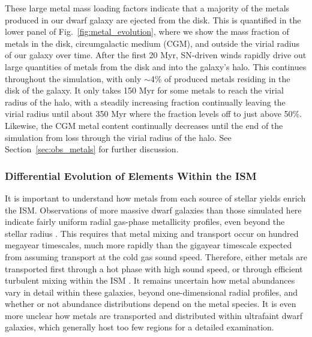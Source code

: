 \documentclass[fleqn,usenatbib,useAMS]{mnras}
\begin{document}
These large metal mass loading factors indicate that a majority of the metals produced in our dwarf galaxy are ejected from the disk. This is quantified in the lower panel of Fig.~\ref{fig:metal_evolution}, where we show the mass fraction of metals in the disk, circumgalactic medium (CGM), and outside the virial radius of our galaxy over time. After the first 20 Myr, SN-driven winds rapidly drive out large quantities of metals from the disk and into the galaxy's halo. This continues throughout the simulation, with only $\sim$4\% of produced metals residing in the disk of the galaxy. It only takes 150 Myr for some metals to reach the virial radius of the halo, with a steadily increasing fraction continually leaving the virial radius until about 350 Myr where the fraction levels off to just above 50\%. Likewise, the CGM metal content continually decreases until the end of the simulation from loss through the virial radius of the halo. See Section~\ref{sec:obs_metals} for further discussion.

\subsubsection{Differential Evolution of Elements Within the ISM}
It is important to understand how metals from each source of stellar yields enrich the ISM. Observations of more massive dwarf galaxies than those simulated here indicate fairly uniform radial gas-phase metallicity profiles, even beyond the stellar radius \citep[e.g.][]{Werk2011,Belfiore2017}. This requires that metal mixing and transport occur on hundred megayear timescales, much more rapidly than the gigayear timescale expected from assuming transport at the cold gas sound speed. Therefore, either metals are transported first through a hot phase with high sound speed, or through efficient turbulent mixing within the ISM \citep[e.g.][]{Avillez2002,Tassis2008,YangKrumholz2012}. It remains uncertain how metal abundances vary in detail within these galaxies, beyond one-dimensional radial profiles, and whether or not abundance distributions depend on the metal species. It is even more unclear how metals are transported and distributed within ultrafaint dwarf galaxies, which generally host too few  regions for a detailed examination.

\end{document}
